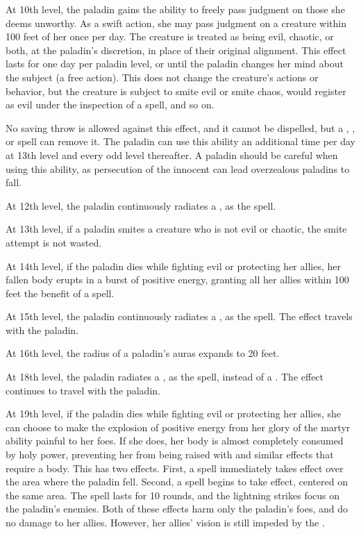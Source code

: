  At 10th level, the paladin gains the ability to freely pass judgment on those she deems unworthy. As a swift action, she may pass judgment on a creature within 100 feet of her once per day. The creature is treated as being evil, chaotic, or both, at the paladin's discretion, in place of their original alignment. This effect lasts for one day per paladin level, or until the paladin changes her mind about the subject (a free action). This does not change the creature's actions or behavior, but the creature is subject to smite evil or smite chaos, would register as evil under the inspection of a  spell, and so on.

No saving throw is allowed against this effect, and it cannot be dispelled, but a , , or  spell can remove it. The paladin can use this ability an additional time per day at 13th level and every odd level thereafter. A paladin should be careful when using this ability, as persecution of the innocent can lead overzealous paladins to fall.

 At 12th level, the paladin continuously radiates a , as the spell.

 At 13th level, if a paladin smites a creature who is not evil or chaotic, the smite attempt is not wasted.

 At 14th level, if the paladin dies while fighting evil or protecting her allies, her fallen body erupts in a burst of positive energy, granting all her allies within 100 feet the benefit of a  spell.

 At 15th level, the paladin continuously radiates a , as the spell. The effect travels with the paladin.

 At 16th level, the radius of a paladin's auras expands to 20 feet.

 At 18th level, the paladin radiates a , as the spell, instead of a . The effect continues to travel with the paladin.

 At 19th level, if the paladin dies while fighting evil or protecting her allies, she can choose to make the explosion of positive energy from her glory of the martyr ability painful to her foes. If she does, her body is almost completely consumed by holy power, preventing her from being raised with  and similar effects that require a body. This has two effects. First, a  spell immediately takes effect over the area where the paladin fell. Second, a  spell begins to take effect, centered on the same area. The spell lasts for 10 rounds, and the lightning strikes focus on the paladin's enemies. Both of these effects harm only the paladin's foes, and do no damage to her allies. However, her allies' vision is still impeded by the .

